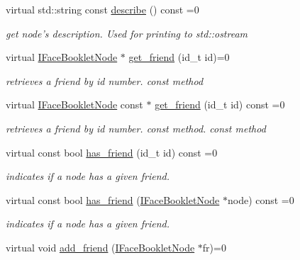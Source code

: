 \begin{DoxyCompactItemize}
\item 
\hypertarget{structfb_1_1_i_face_booklet_node_a4ccb08dfa3ae0af8836cec58f8439adc}{virtual std\+::string const \hyperlink{structfb_1_1_i_face_booklet_node_a4ccb08dfa3ae0af8836cec58f8439adc}{describe} () const =0}\label{structfb_1_1_i_face_booklet_node_a4ccb08dfa3ae0af8836cec58f8439adc}

\begin{DoxyCompactList}\small\item\em get node's description.  Used for printing to std\+::ostream \end{DoxyCompactList}\item 
virtual \hyperlink{structfb_1_1_i_face_booklet_node}{I\+Face\+Booklet\+Node} $\ast$ \hyperlink{structfb_1_1_i_face_booklet_node_ae78da353e70e25f3fac8976618bfcde8}{get\+\_\+friend} (id\+\_\+t id)=0
\begin{DoxyCompactList}\small\item\em retrieves a friend by id number.  const method \end{DoxyCompactList}\item 
virtual \hyperlink{structfb_1_1_i_face_booklet_node}{I\+Face\+Booklet\+Node} const $\ast$ \hyperlink{structfb_1_1_i_face_booklet_node_a3a1b982ac4239e23c2204c7746dc90f0}{get\+\_\+friend} (id\+\_\+t id) const =0
\begin{DoxyCompactList}\small\item\em retrieves a friend by id number. const method.  const method \end{DoxyCompactList}\item 
virtual const bool \hyperlink{structfb_1_1_i_face_booklet_node_a2692d3ad9e903bd545c7074c710e5cdc}{has\+\_\+friend} (id\+\_\+t id) const =0
\begin{DoxyCompactList}\small\item\em indicates if a node has a given friend. \end{DoxyCompactList}\item 
virtual const bool \hyperlink{structfb_1_1_i_face_booklet_node_af821de82c96e235108ca909a92838dc1}{has\+\_\+friend} (\hyperlink{structfb_1_1_i_face_booklet_node}{I\+Face\+Booklet\+Node} $\ast$node) const =0
\begin{DoxyCompactList}\small\item\em indicates if a node has a given friend. \end{DoxyCompactList}\item 
\hypertarget{structfb_1_1_i_face_booklet_node_a1add30a9097411c481cf0fe2cf69f648}{virtual void \hyperlink{structfb_1_1_i_face_booklet_node_a1add30a9097411c481cf0fe2cf69f648}{add\+\_\+friend} (\hyperlink{structfb_1_1_i_face_booklet_node}{I\+Face\+Booklet\+Node} $\ast$fr)=0}\label{structfb_1_1_i_face_booklet_node_a1add30a9097411c481cf0fe2cf69f648}


\end{DoxyCompactItemize}
